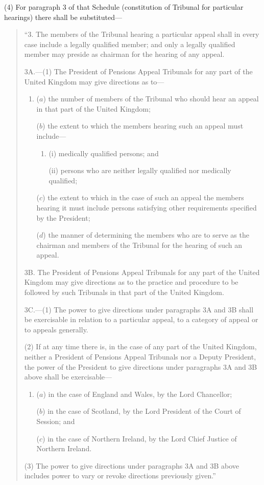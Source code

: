 \documentclass[12pt,a4paper]{article}
\begin{document}
(4) For paragraph 3 of that Schedule (constitution of Tribunal for particular hearings) there shall be substituted—
\begin{quotation}
“3. The members of the Tribunal hearing a particular appeal shall in every case include a legally qualified member; and only a legally qualified member may preside as chairman for the hearing of any appeal.

\medskip

3A.---(1) The President of Pensions Appeal Tribunals for any part of the United Kingdom may give directions as to—
\begin{enumerate}\item[]
($a$) the number of members of the Tribunal who should hear an appeal in that part of the United Kingdom;

($b$) the extent to which the members hearing such an appeal must include—
\begin{enumerate}\item[]
(i) medically qualified persons; and

(ii) persons who are neither legally qualified nor medically qualified;
\end{enumerate}

($c$) the extent to which in the case of such an appeal the members hearing it must include persons satisfying other requirements specified by the President;

($d$) the manner of determining the members who are to serve as the chairman and members of the Tribunal for the hearing of such an appeal.
\end{enumerate}

\medskip

3B. The President of Pensions Appeal Tribunals for any part of the United Kingdom may give directions as to the practice and procedure to be followed by such Tribunals in that part of the United Kingdom.

\medskip

3C.---(1) The power to give directions under paragraphs 3A and 3B shall be exercisable in relation to a particular appeal, to a category of appeal or to appeals generally.

(2) If at any time there is, in the case of any part of the United Kingdom, neither a President of Pensions Appeal Tribunals nor a Deputy President, the power of the President to give directions under paragraphs 3A and 3B above shall be exercisable—
\begin{enumerate}\item[]
($a$) in the case of England and Wales, by the Lord Chancellor;

($b$) in the case of Scotland, by the Lord President of the Court of Session; and

($c$) in the case of Northern Ireland, by the Lord Chief Justice of Northern Ireland.
\end{enumerate}

(3) The power to give directions under paragraphs 3A and 3B above includes power to vary or revoke directions previously given.”
\end{quotation}
\end{document}
